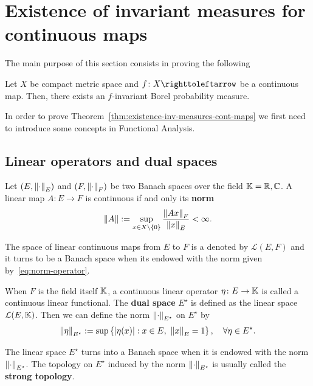 \section{Existence of invariant measures for continuous maps}\label{sec:exist-invar-meas-cont-maps}

The main purpose of this section consists in proving the following

\begin{theorem}\label{thm:existence-inv-measures-cont-maps}
  Let $X$ be compact metric space and $f\colon X\carr$ be a continuous map. Then, there exists an $f$-invariant Borel probability measure.
\end{theorem}

In order to prove Theorem~\ref{thm:existence-inv-measures-cont-maps} we first need to introduce some concepts in Functional Analysis.

\subsection{Linear operators and dual spaces}\label{sec:line-oper-dual-spaces}

Let $(E,\left\|{\cdot}\right\|_{E})$ and $(F,\left\|{\cdot}\right\|_{F})$ be two Banach spaces over the field $\mathbb{K}=\mathbb{R},\mathbb{C}$. A linear map $A\colon E\to F$ is continuous if and only its \textbf{norm}
\begin{equation}
  \label{eq:norm-operator}
  \left\|{A}\right\|:=\sup_{x\in X\setminus\{0\}} \frac{\left\|{Ax}\right\|_{F}}{\left\|{x}\right\|_{E}} <\infty.
\end{equation}

The space of linear continuous maps from $E$ to $F$ is a denoted by $\mathcal{L}(E,F)$ and it turns to be a Banach space when its endowed with the norm given by~\eqref{eq:norm-operator}.

When $F$ is the field itself $\mathbb{K}$, a continuous linear operator $\eta\colon E\to\mathbb{K}$ is called a continuous linear functional. The \textbf{dual space} $E^{\star}$ is defined as the linear space $\mathcal{L}(E,\mathbb{K})$. Then we can define the norm $\left\|{\cdot}\right\|_{E^{\star}}$ on $E^{\star}$ by
\begin{displaymath}
  \left\|{\eta}\right\|_{E^{\star}}:=\sup\left\{\left\lvert{\eta(x)}\right\rvert : x\in E,\ \left\|{x}\right\|_{E}=1\right\}, \quad\forall \eta\in E^{\star}.
\end{displaymath}

The linear space $E^{\star}$ turns into a Banach space when it is endowed with the norm $\left\|{\cdot}\right\|_{E^{\star}}$. The topology on $E^{\star}$ induced by the norm $\left\|{\cdot}\right\|_{E^{\star}}$ is usually called the \textbf{strong topology}.

